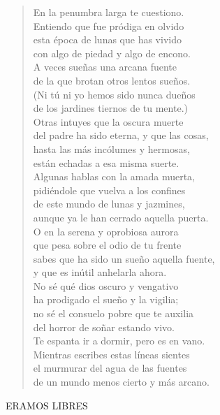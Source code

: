 \documentclass[a4paper, 12pt]{article}
\begin{document}
\begin{verse}
    
En la penumbra larga te cuestiono.\\
Entiendo que fue pródiga en olvido\\
esta época de lunas que has vivido\\
con algo de piedad y algo de encono.\\
A veces sueñas una arcana fuente\\
de la que brotan otros lentos sueños.\\
(Ni tú ni yo hemos sido nunca dueños\\
de los jardines tiernos de tu mente.)\\
Otras intuyes que la oscura muerte\\
del padre ha sido eterna, y que las cosas,\\
hasta las más incólumes y hermosas,\\
están echadas a esa misma suerte.\\
Algunas hablas con la amada muerta,\\
pidiéndole que vuelva a los confines\\
de este mundo de lunas y jazmines,\\
aunque ya le han cerrado aquella puerta.\\
O en la serena y oprobiosa aurora\\
que pesa sobre el odio de tu frente\\
sabes que ha sido un sueño aquella fuente,\\
y que es inútil anhelarla ahora.\\
No sé qué dios oscuro y vengativo\\
ha prodigado el sueño y la vigilia;\\
no sé el consuelo pobre que te auxilia\\
del horror de soñar estando vivo.\\
Te espanta ir a dormir, pero es en vano.\\
Mientras escribes estas líneas sientes\\
el murmurar del agua de las fuentes\\
de un mundo menos cierto y más arcano.\\
\end{verse}

\pagebreak 
\centerline{ERAMOS LIBRES}
~
\end{document}
